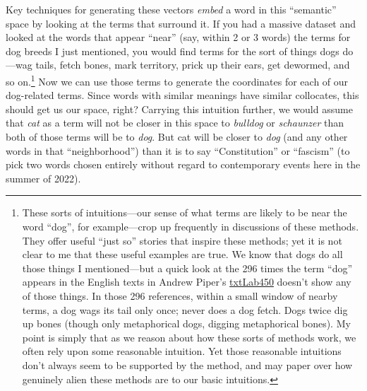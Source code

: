 \documentclass[
  12pt,
]{article}
\begin{document}
Key techniques for generating these vectors \emph{embed} a word in this
``semantic'' space by looking at the terms that surround it. If you had
a massive dataset and looked at the words that appear ``near'' (say,
within 2 or 3 words) the terms for dog breeds I just mentioned, you
would find terms for the sort of things dogs do---wag tails, fetch
bones, mark territory, prick up their ears, get dewormed, and so
on.\footnote{These sorts of intuitions---our sense of what terms are
  likely to be near the word ``dog'', for example---crop up frequently
  in discussions of these methods. They offer useful ``just so'' stories
  that inspire these methods; yet it is not clear to me that these
  useful examples are true. We know that dogs do all those things I
  mentioned---but a quick look at the 296 times the term ``dog'' appears
  in the English texts in Andrew Piper's
  \href{https://txtlab.org/2016/01/txtlab450-a-data-set-of-multilingual-novels-for-teaching-and-research/}{txtLab450}
  doesn't show any of those things. In those 296 references, within a
  small window of nearby terms, a dog wags its tail only once; never
  does a dog fetch. Dogs twice dig up bones (though only metaphorical
  dogs, digging metaphorical bones). My point is simply that as we
  reason about how these sorts of methods work, we often rely upon some
  reasonable intuition. Yet those reasonable intuitions don't always
  seem to be supported by the method, and may paper over how genuinely
  alien these methods are to our basic intuitions.} Now we can use those
terms to generate the coordinates for each of our dog-related terms.
Since words with similar meanings have similar collocates, this should
get us our space, right? Carrying this intuition further, we would
assume that \emph{cat} as a term will not be closer in this space to
\emph{bulldog} or \emph{schaunzer} than both of those terms will be to
\emph{dog}. But cat will be closer to \emph{dog} (and any other words in
that ``neighborhood'') than it is to say ``Constitution'' or ``fascism''
(to pick two words chosen entirely without regard to contemporary events
here in the summer of 2022).
\end{document}
